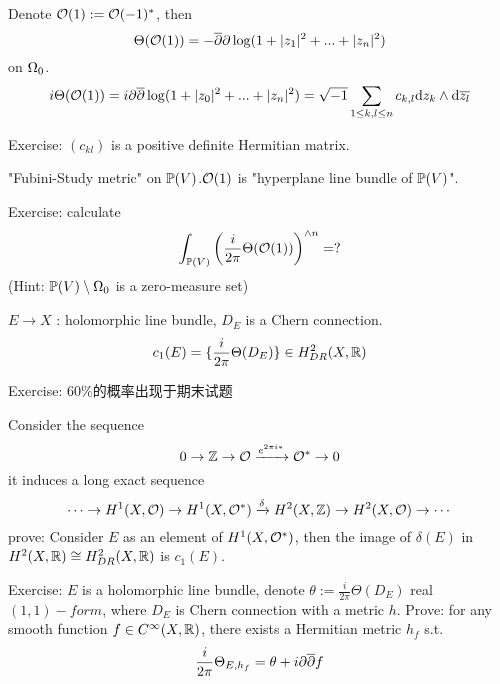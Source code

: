Denote $\mathcal{O}(1):=\mathcal{O}(-1)^*$, then
$$\Theta(\mathcal{O}(1))=-\overline{\partial}\partial\log(1+|z_1|^2+...+|z_n|^2)$$
on $\Omega_0$.
$$i\Theta(\mathcal{O}(1))=i\partial\overline{\partial}\log(1+|z_0|^2+...+|z_n|^2)
=\sqrt{-1}\sum_{1\leq k,l\leq n}
c_{k,l}\mathrm{d} z_k\wedge\mathrm{d}\overline{z_l}$$

Exercise: $(c_{kl})$ is a positive definite Hermitian matrix.

"Fubini-Study metric" on $\mathbb{P}(V)$.$\mathcal{O}(1)$ is
"hyperplane line bundle of $\mathbb{P}(V)$".

Exercise: calculate
$$\int_{\mathbb{P}(V)}
    \left(
      \frac{i}{2\pi}
      \Theta(\mathcal{O}(1))
    \right)^{\wedge n}
=?
$$
(Hint: $\mathbb{P}(V)\setminus\Omega_0$ is a zero-measure set)

$E\to X$ : holomorphic line bundle, $D_E$ is a Chern connection.
$$c_1(E)=\{\frac{i}{2\pi}\Theta(D_E)\}\in H_{DR}^2(X,\mathbb{R})$$

Exercise:
{\color{red} $60\%$的概率出现于期末试题}

Consider the sequence
$$0\to\mathbb{Z}\to\mathcal{O}\xrightarrow{e^{2\pi i *}}\mathcal{O}^*\to 0$$
it induces a long exact sequence
$$\cdots\to
H^1(X,\mathcal{O})\to H^1(X,\mathcal{O}^*)\xrightarrow{\delta}H^2(X,\mathbb{Z})\to H^2(X,\mathcal{O})\to\cdots
$$
prove: Consider $E$ as an element of $H^1(X,\mathcal{O}^*)$, then the
image of $\delta(E)$ in $H^2(X,\mathbb{R})\cong H^2_{DR}(X,\mathbb{R})$ is $c_1(E)$.

Exercise: $E$ is a holomorphic line bundle, denote
$\theta:=\frac{i}{2\pi}\Theta(D_E)$ real $(1,1)-form$,
where $D_E$ is Chern connection
with a metric $h$.
Prove: for any smooth function $f\in C^\infty(X,\mathbb{R})$,
there exists a Hermitian metric $h_f$ s.t.
$$\frac{i}{2\pi}\Theta_{E,h_f}=\theta+i\partial\overline{\partial} f$$


